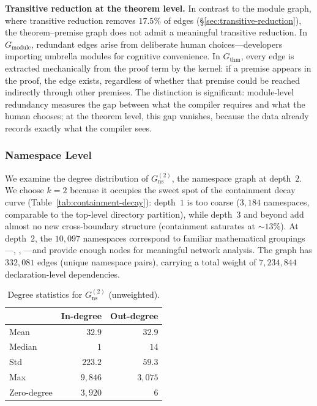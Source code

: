 \noindent\textbf{Transitive reduction at the theorem level.}
\label{rem:thm-transitive-reduction}
In contrast to the module graph, where transitive reduction removes $17.5\%$ of edges (\S\ref{sec:transitive-reduction}), the theorem--premise graph does not admit a meaningful transitive reduction. In $G_{\mathrm{module}}$, redundant edges arise from deliberate human choices---developers importing umbrella modules for cognitive convenience. In $G_{\mathrm{thm}}$, every edge is extracted mechanically from the proof term by the kernel: if a premise appears in the proof, the edge exists, regardless of whether that premise could be reached indirectly through other premises. The distinction is significant: module-level redundancy measures the gap between what the compiler requires and what the human chooses; at the theorem level, this gap vanishes, because the data already records exactly what the compiler sees.

\subsubsection{Namespace Level}
\label{sec:ns-degree}

We examine the degree distribution of $G_{\mathrm{ns}}^{(2)}$, the namespace graph at depth~$2$. We choose $k = 2$ because it occupies the sweet spot of the containment decay curve (Table~\ref{tab:containment-decay}): depth~$1$ is too coarse ($3{,}184$ namespaces, comparable to the top-level directory partition), while depth~$3$ and beyond add almost no new cross-boundary structure (containment saturates at ${\sim}13\%$). At depth~$2$, the $10{,}097$ namespaces correspond to familiar mathematical groupings---, , ---and provide enough nodes for meaningful network analysis. The graph has $332{,}081$ edges (unique namespace pairs), carrying a total weight of $7{,}234{,}844$ declaration-level dependencies.

\begin{table}[ht]
\centering
\caption{Degree statistics for $G_{\mathrm{ns}}^{(2)}$ (unweighted).}
\label{tab:ns-degree-stats}
\begin{tabular}{lrr}
\toprule
& In-degree & Out-degree \\
\midrule
Mean        & $32.9$    & $32.9$ \\
Median      & $1$       & $14$ \\
Std         & $223.2$   & $59.3$ \\
Max         & $9{,}846$ & $3{,}075$ \\
Zero-degree & $3{,}920$ & $6$ \\
\bottomrule
\end{tabular}
\end{table}

